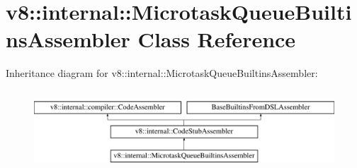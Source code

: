 \hypertarget{classv8_1_1internal_1_1MicrotaskQueueBuiltinsAssembler}{}\section{v8\+:\+:internal\+:\+:Microtask\+Queue\+Builtins\+Assembler Class Reference}
\label{classv8_1_1internal_1_1MicrotaskQueueBuiltinsAssembler}
Inheritance diagram for v8\+:\+:internal\+:\+:Microtask\+Queue\+Builtins\+Assembler\+:\begin{figure}[H]
\begin{center}
\leavevmode
\includegraphics[height=3.000000cm]{classv8_1_1internal_1_1MicrotaskQueueBuiltinsAssembler}
\end{center}
\end{figure}
